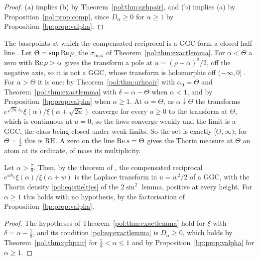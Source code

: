 \begin{proof}
(a) implies (b) by Theorem~\ref{pol:thm:qrhpair}, and (b) implies (a) by Proposition~\ref{pol:prop:comp}, since $D_\alpha\ge0$ for $\alpha\ge1$ by Proposition~\ref{bp:prop:valpha}.
\end{proof}

\begin{resultpar}\label{pol:res:halfline}The basepoints at which the compensated reciprocal is a GGC form a closed half line \cite{PolsonRXi26}. Let $\Theta=\sup\operatorname{Re}\rho$, the $\sigma_{\max}$ of Theorem~\ref{pol:thm:exactlemma}. For $\alpha<\Theta$ a zero with $\operatorname{Re}\rho>\alpha$ gives the transform a pole at $u=(\rho-\alpha)^2/2$, off the negative axis, so it is not a GGC, whose transform is holomorphic off $(-\infty,0]$ \cite{Bondesson}. For $\alpha>\Theta$ it is one: by Theorem~\ref{pol:thm:qrhpair} with $\alpha_0=\Theta$ and Theorem~\ref{pol:thm:exactlemma} with $\delta=\alpha-\Theta$ when $\alpha<1$, and by Proposition~\ref{bp:prop:valpha} when $\alpha\ge1$. At $\alpha=\Theta$, as $\alpha\downarrow\Theta$ the transforms $e^{\sqrt{2u}\,b_\alpha}\xi(\alpha)/\xi(\alpha+\sqrt{2u})$ converge for every $u\ge0$ to the transform at $\Theta$, which is continuous at $u=0$; so the laws converge weakly and the limit is a GGC, the class being closed under weak limits. So the set is exactly $[\Theta,\infty)$; for $\Theta=\frac12$ this is RH. A zero on the line $\operatorname{Re} s=\Theta$ gives the Thorin measure at $\Theta$ an atom at its ordinate, of mass its multiplicity.\end{resultpar}

\begin{corollary}\label{pol:cor:qrhggc}
Let $\alpha>\frac78$. Then, by the theorem of \cite{OAI26a}, the compensated reciprocal $e^{wb_\alpha}\xi(\alpha)/\xi(\alpha+w)$ is the Laplace transform in $u=w^2/2$ of a GGC, with the Thorin density \eqref{pol:eq:stieltjes} of the $2\sin^2$ lemma, positive at every height. For $\alpha\ge1$ this holds with no hypothesis, by the factorisation of Proposition~\ref{bp:prop:valpha}.
\end{corollary}

\begin{proof}
The hypotheses of Theorem~\ref{pol:thm:exactlemma} hold for $\xi$ with $\delta=\alpha-\frac78$, and its condition \eqref{pol:eq:exactlemma} is $D_\alpha\ge0$, which holds by Theorem~\ref{pol:thm:qrhpair} for $\frac78<\alpha\le1$ and by Proposition~\ref{bp:prop:valpha} for $\alpha\ge1$.
\end{proof}

